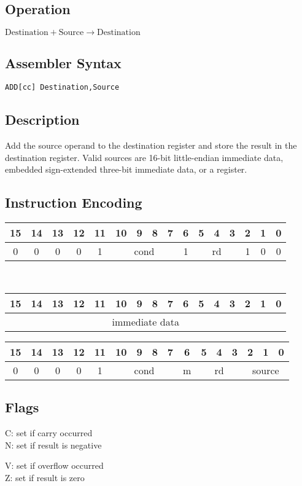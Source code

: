 \documentclass[11pt]{book}
\newcommand*{\encoding}[1]{\noindent
\begin{tabular}{|c|c|c|c|c|c|c|c|c|c|c|c|c|c|c|c|}
\multicolumn{1}{c}{15}&
\multicolumn{1}{c}{14}&
\multicolumn{1}{c}{13}&
\multicolumn{1}{c}{12}&
\multicolumn{1}{c}{11}&
\multicolumn{1}{c}{10}&
\multicolumn{1}{c}{9}&
\multicolumn{1}{c}{8}&
\multicolumn{1}{c}{7}&
\multicolumn{1}{c}{6}&
\multicolumn{1}{c}{5}&
\multicolumn{1}{c}{4}&
\multicolumn{1}{c}{3}&
\multicolumn{1}{c}{2}&
\multicolumn{1}{c}{1}&
\multicolumn{1}{c}{0}\\\hline
#1\\\hline
\end{tabular}}
\newcommand*{\instruction}[2][]{%
  \clearpage
  \thispagestyle{fancy}%
  \fancyhf[HL,HR]{\huge{#2}}%
  \fancyhf[HC]{#1}\addtocounter{section}{1}\noindent
}
\begin{document}

\instruction[Add]{ADD}
\subsection*{Operation}
\(\text{Destination}+\text{Source}\rightarrow\text{Destination}\)

\subsection*{Assembler Syntax}
\texttt{ADD[cc] Destination,Source}

\subsection*{Description}
Add the source operand to the destination register
and store the result in the destination register.
Valid sources are 16-bit little-endian immediate data,
embedded sign-extended three-bit immediate data,
or a register.

\subsection*{Instruction Encoding}
\encoding{0&0&0&0&1%
&\multicolumn{4}{|c|}{cond}%
&1&\multicolumn{3}{|c|}{rd}&1&0&0}\\\null\qquad
\encoding{\multicolumn{16}{|c|}{immediate data}}

\vspace{2\baselineskip}
\encoding{0&0&0&0&1%
&\multicolumn{4}{|c|}{cond}%
&m&\multicolumn{3}{|c|}{rd}&\multicolumn{3}{|c|}{source}}

\subsection*{Flags}
\begin{multicols}{2}\noindent
  C: set if carry occurred\\
  N: set if result is negative

  \columnbreak\noindent
  V: set if overflow occurred\\
  Z: set if result is zero
\end{multicols}
\end{document}
